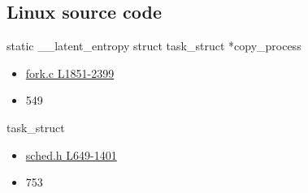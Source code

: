 \documentclass{beamer}
\begin{document}
\begin{CJK*}{UTF8}{bsmi}
    \section{Linux source code}
    \begin{frame}
        static \_\_latent\_entropy struct task\_struct *copy\_process
        \begin{itemize}
            \item \href{https://github.com/torvalds/linux/blob/master/kernel/fork.c\#L1851-L2399}{fork.c L1851-2399}
            \item 549
        \end{itemize}

        task\_struct
        \begin{itemize}
            \item \href{https://github.com/torvalds/linux/blob/master/include/linux/sched.h\#L649-L1401}{sched.h L649-1401}
            \item 753
        \end{itemize}
    \end{frame}


\end{CJK*}
\end{document}
